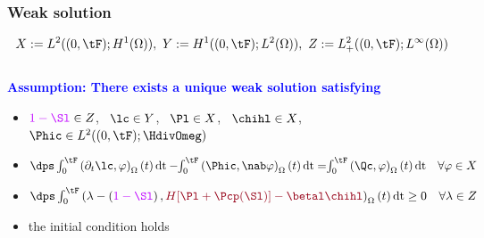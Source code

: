 \begin{frame}
\frametitle{Weak solution}
\begin{equation*}
X \egaldef L^2((0,\tF);H^1(\Omega)), \ Y  \egaldef H^1((0,\tF);L^2(\Omega)), 
 \  Z \egaldef L_{+}^2((0,\tF);L^{\infty}(\Omega)) 
\end{equation*}
\\
\vspace{0.5 cm}
\textcolor{blue}{\textbf{Assumption: There exists a unique weak solution satisfying}}
\begin{itemize}
\item
$\textcolor{electricpurple}{1-\Sl} \in Z$, \ $\lc \in Y$, \ $\Pl \in X$, \ $\chihl \in X$, \ $\Phic \in L^2((0,\tF); \HdivOmeg)$
\item 
$\dps \int_{0}^{\tF} \left(\partial_t \lc, \varphi \right)_{\Omega}(t)\,\mathrm{dt}-\hspace{-0.1 cm}\int_{0}^{\tF} \left(\Phic, \nab \varphi \right)_{\Omega}(t)\,\mathrm{dt} = \hspace{-0.1 cm} \int_{0}^{\tF} \left(\Qc, \varphi \right)_{\Omega}(t)\,\mathrm{dt} \quad \forall \varphi \in X$
\item 
$\dps \int_{0}^{\tF} \left(\lambda - \left(\textcolor{electricpurple}{1 - \Sl}\right), \textcolor{carmine}{H[\Pl+\Pcp(\Sl)]-\betal \chihl}  \right)_{\Omega}(t)\,\mathrm{dt} \geq 0 \quad \forall \lambda \in Z$
\item
the initial condition  holds
\end{itemize}
\end{frame}


